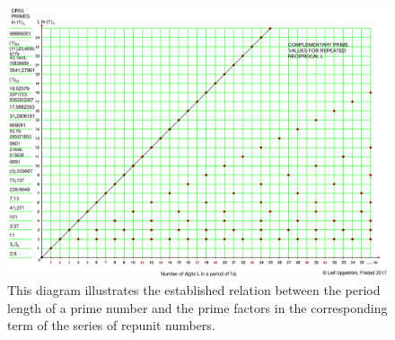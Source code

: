 \documentclass[10pt,twoside,a4paper]{amsart}
\begin{document}
\begin{figure}
\centering
\includegraphics[angle=90,scale=0.7]{diagram.eps}
\caption{This diagram illustrates the established relation between the period length of a prime number and the prime factors in the corresponding term of the series of repunit numbers.}
\label{fig:aa}
\end{figure}
\end{document}

